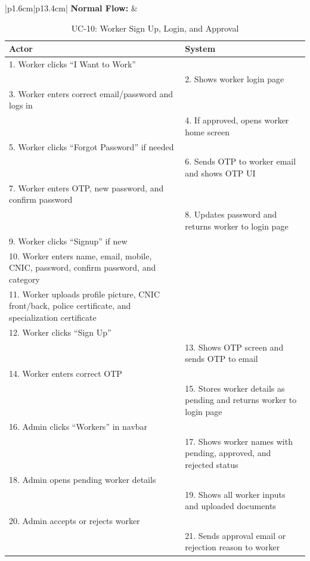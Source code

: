 {\scriptsize
\setlength{\tabcolsep}{2pt}
\renewcommand{\arraystretch}{0.72}
\begin{table}[H]
\centering
\begin{tabular}{|p{1.6cm}|p{13.4cm}|}
\hline
\textbf{Normal Flow:} &
\begin{tabular}[t]{|p{6.55cm}|p{6.55cm}|}
\hline
\textbf{Actor} & \textbf{System} \\ \hline
1. Worker clicks ``I Want to Work'' & \\ \hline
 & 2. Shows worker login page \\ \hline
3. Worker enters correct email/password and logs in & \\ \hline
 & 4. If approved, opens worker home screen \\ \hline
5. Worker clicks ``Forgot Password'' if needed & \\ \hline
 & 6. Sends OTP to worker email and shows OTP UI \\ \hline
7. Worker enters OTP, new password, and confirm password & \\ \hline
 & 8. Updates password and returns worker to login page \\ \hline
9. Worker clicks ``Signup'' if new & \\ \hline
10. Worker enters name, email, mobile, CNIC, password, confirm password, and category & \\ \hline
11. Worker uploads profile picture, CNIC front/back, police certificate, and specialization certificate & \\ \hline
12. Worker clicks ``Sign Up'' & \\ \hline
 & 13. Shows OTP screen and sends OTP to email \\ \hline
14. Worker enters correct OTP & \\ \hline
 & 15. Stores worker details as pending and returns worker to login page \\ \hline
16. Admin clicks ``Workers'' in navbar & \\ \hline
 & 17. Shows worker names with pending, approved, and rejected status \\ \hline
18. Admin opens pending worker details & \\ \hline
 & 19. Shows all worker inputs and uploaded documents \\ \hline
20. Admin accepts or rejects worker & \\ \hline
 & 21. Sends approval email or rejection reason to worker \\ \hline
\end{tabular} \\ \hline
\end{tabular}
\caption{UC-10: Worker Sign Up, Login, and Approval}
\end{table}
}

